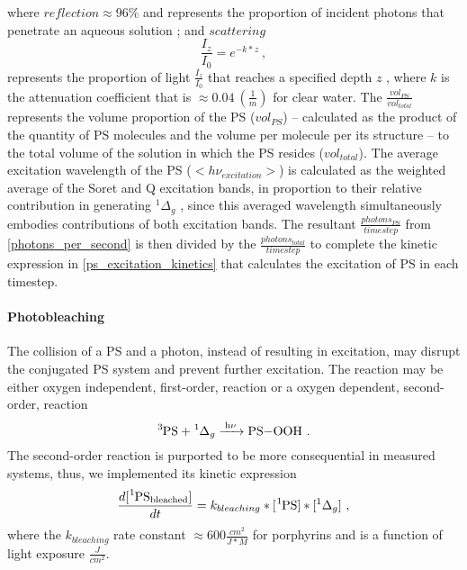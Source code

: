 where $reflection \approx 96 \%$ and represents the proportion of incident photons that penetrate an aqueous solution \cite{Gross1993SingletLiposomes}; and $scattering$  
\begin{equation}
    \frac{I_z}{I_0} = e^{-k*z}~,
\end{equation}
represents the proportion of light $\frac{I_z}{I_0}$ that reaches a specified depth $z$ \cite{RobertW.1973TheSea}, where $k$ is the attenuation coefficient that is $\approx 0.04~(\frac{1}{m})$ \cite{Lorenzen1972ExtinctionPhytoplankton} for clear water. The $\frac{vol_{PS}}{vol_{total}}$ represents the volume proportion of the PS ($vol_{PS}$) -- calculated as the product of the quantity of PS molecules and the volume per molecule per its structure -- to the total volume of the solution in which the PS resides ($vol_{total}$). The average excitation wavelength of the PS ($<h\nu_{excitation}>$) is calculated as the weighted average of the Soret and Q excitation bands, in proportion to their relative contribution in generating $^1\Delta_g$ \cite{Nitzan2001PhotoinactivationWavelengths,Hoenes2020PhotoinactivationWavelength}, since this averaged wavelength simultaneously embodies contributions of both excitation bands. The resultant $\frac{photons_{PS}}{timestep}$ from \cref{photons_per_second} is then divided by the $\frac{photons_{total}}{timestep}$ to complete the kinetic expression in \cref{ps_excitation_kinetics} that calculates the excitation of PS in each timestep. 

\paragraph{Photobleaching}
The collision of a PS and a photon, instead of resulting in excitation, may disrupt the conjugated PS system and prevent further excitation. The reaction may be either oxygen independent, first-order, reaction \cite{Bonnett1999PhotobleachingStudy,Mang1987PhotobleachingTherapy} or a oxygen dependent, second-order, reaction 
\begin{equation}
    \ce{^3PS + ^1\Delta_g ->[h\nu] PS-OOH}~.
\end{equation}
The second-order reaction is purported to be more consequential in measured systems, thus, we implemented its kinetic expression 
\begin{equation} \label{bleaching_kinetics}
    \frac{d[\ce{^1PS_{bleached}}]}{dt} = k_{bleaching}*[\ce{^1PS}]*[^1\Delta_g]~,
\end{equation}
where the $k_{bleaching}$ rate constant $\approx 600 \frac{cm^2}{J*M}$ \cite{Dysart2005CalculationCells} for porphyrins and is a function of light exposure $\frac{J}{cm^2}$.

